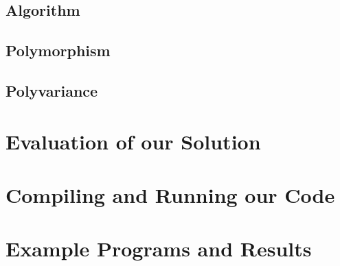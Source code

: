 \documentclass[a4paper,11pt]{article}
\begin{document}
\begin{prooftree}
\end{prooftree}

\subsection{Algorithm}
\subsection{Polymorphism}
\subsection{Polyvariance}


\section{Evaluation of our Solution}


\section{Compiling and Running our Code}


\section{Example Programs and Results}
\end{document}

